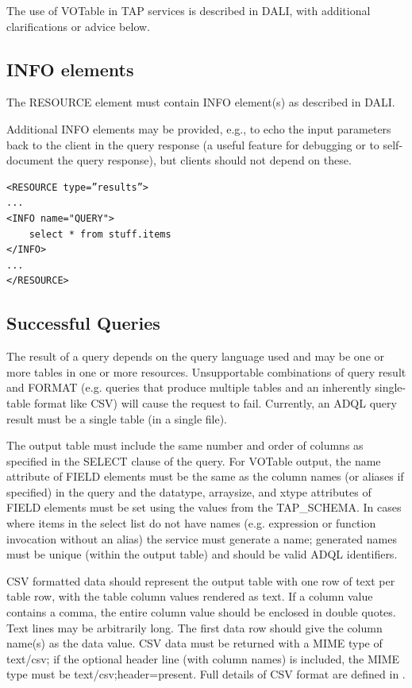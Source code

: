 \documentclass[11pt,letter]{ivoa}
\newcommand{\tapschema}{TAP\_SCHEMA}
\newcommand{\tapschema}{\mbox{%
  \relsize{-0.5}TAP\discretionary{-}{}{\kern-2pt\_}SCHEMA}}
\begin{document}
The use of VOTable in TAP services is described in DALI, with additional clarifications
or advice below.

\subsection{INFO elements}
\label{sec:vot-info}

The RESOURCE element must contain INFO element(s) as described in DALI.

Additional INFO elements may be provided, e.g., to echo the input parameters 
back to the client in the query response (a useful feature for debugging or to 
self-document the query response), but clients should not depend on these. 

\begin{verbatim}
<RESOURCE type=”results”>
...
<INFO name="QUERY">
    select * from stuff.items
</INFO>
...
</RESOURCE>
\end{verbatim}

\subsection{Successful Queries}
\label{sec:query-ok}

The result of a query depends on the query language used and may be one or more 
tables in one or more resources. Unsupportable combinations of query result and 
FORMAT (e.g. queries that produce multiple tables and an inherently 
single-table format like CSV) will cause the request to fail. Currently, an ADQL 
query result must be a single table (in a single file).

The output table must include the same number and order of columns as specified 
in the SELECT clause of the query. For VOTable output, the name attribute of 
FIELD elements must be the same as the column names (or aliases if specified)  
in the query and the datatype, arraysize, and xtype 
attributes of FIELD elements must be set using the values from the \tapschema. 
In cases where items in the select list do not 
have names (e.g. expression or function invocation without an alias) the service 
must generate a name; 
generated names must be unique (within the output table) and should be valid 
ADQL identifiers.

CSV formatted data should represent the output table with one row of text per 
table row, with the table column values rendered as text. 
If a column value contains a comma, the entire column value should be 
enclosed in double quotes.  Text lines may be arbitrarily long.  The first data 
row should give the column name(s) as the data value.   CSV data must be returned 
with a MIME type of text/csv; if the optional header line (with column names) 
is included, the MIME type must be text/csv;header=present. Full details of CSV 
format are defined in \citet{std:CSV}.
\end{document}
